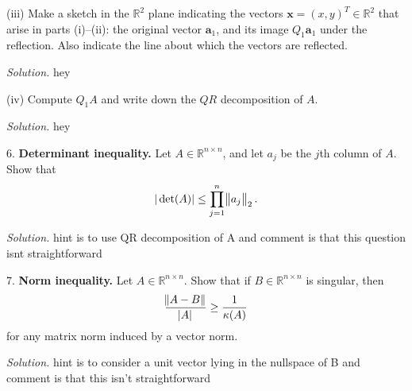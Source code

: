 \documentclass{article}
\def\*#1{\mathbf{#1}}
\newcommand{\R}{\mathbb{R}}
\begin{document}
\vspace{5mm}

(iii) Make a sketch in the $\R^2$ plane indicating the vectors
$\*x = (x, y)^T \in \R^2$ that arise in parts (i)--(ii):
the original vector $\*a_1$, and its image $Q_1 \*a_1$ under the reflection.
Also indicate the line about which the vectors are reflected.

\textit{Solution.}
hey

\vspace{5mm}

(iv) Compute $Q_1 A$ and write down the $QR$ decomposition of $A$.

\textit{Solution.}
hey

\newpage

6. \textbf{Determinant inequality.}
Let $A \in \R^{n \times n}$, and let $a_j$ be the $j$th column of $A$.
Show that
%
\begin{equation*}
    |\det(A)| \leq \prod_{j = 1}^n \enVert{a_j}_2
    .
\end{equation*}

\textit{Solution.}
hint is to use QR decomposition of A and comment is that this question isnt
straightforward

\newpage

7. \textbf{Norm inequality.}
Let $A \in \R^{n \times n}$. Show that if $B \in \R^{n \times n}$ is
singular, then
%
\begin{equation*}
    \frac{\enVert{A - B}}{\envert{A}} \geq \frac{1}{\kappa(A)}
\end{equation*}
%
for any matrix norm induced by a vector norm.

\textit{Solution.}
hint is to consider a unit vector lying in the nullspace of B and comment
is that this isn't straightforward
\end{document}
